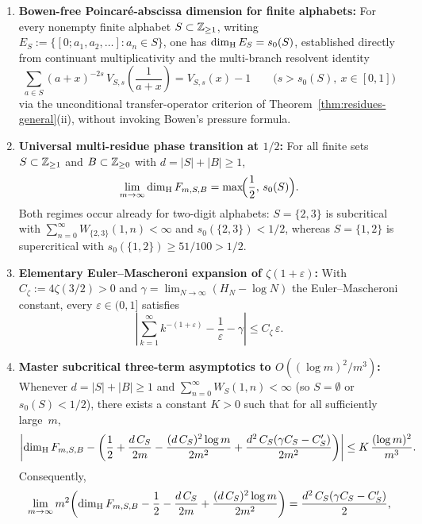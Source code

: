 \begin{theorem}\label{thm:multi-residue-asymptotic}
\begin{enumerate}[label=\textup{(\roman*)},leftmargin=2.2em]
\item \textbf{Bowen-free Poincar\'e-abscissa dimension for finite alphabets:}
For every nonempty finite alphabet $S\subset\mathbb{Z}_{\ge1}$, writing
$E_S:=\{[0;a_1,a_2,\dots]:a_n\in S\}$, one has $\dim_{\mathrm{H}} E_S=s_0(S)$, established
directly from continuant multiplicativity and the multi-branch resolvent
identity
\begin{equation}\label{eq:multi-resolvent-branch}
\sum_{a\in S}(a+x)^{-2s}\,V_{S,s}\!\left(\frac{1}{a+x}\right)=V_{S,s}(x)-1
\qquad\bigl(s>s_0(S),\ x\in[0,1]\bigr)
\end{equation}
via the unconditional transfer-operator criterion of Theorem~\ref{thm:residues-general}\textup{(ii)},
without invoking Bowen's pressure formula.
\item \textbf{Universal multi-residue phase transition at $1/2$:}
For all finite sets $S\subset\mathbb{Z}_{\ge1}$ and $B\subset\mathbb{Z}_{\ge0}$ with
$d=|S|+|B|\ge1$,
\[
\lim_{m\to\infty}\dim_{\mathrm{H}} F_{m,S,B}=\max\!\Bigl(\frac12,\,s_0(S)\Bigr).
\]
Both regimes occur already for two-digit alphabets: $S=\{2,3\}$ is subcritical
with $\sum_{n=0}^\infty W_{\{2,3\}}(1,n)<\infty$ and $s_0(\{2,3\})<1/2$, whereas
$S=\{1,2\}$ is supercritical with $s_0(\{1,2\})\ge 51/100>1/2$.
\item \textbf{Elementary Euler--Mascheroni expansion of $\zeta(1+\varepsilon)$:}
With $C_\zeta:=4\zeta(3/2)>0$ and $\gamma=\lim_{N\to\infty}(H_N-\log N)$ the
Euler--Mascheroni constant, every $\varepsilon\in(0,1]$ satisfies
\[
\left|\sum_{k=1}^\infty k^{-(1+\varepsilon)}-\frac{1}{\varepsilon}-\gamma\right|
\le C_\zeta\,\varepsilon.
\]
\item \textbf{Master subcritical three-term asymptotics to $O((\log m)^2/m^3)$:}
Whenever $d=|S|+|B|\ge1$ and $\sum_{n=0}^\infty W_S(1,n)<\infty$
(so $S=\emptyset$ or $s_0(S)<1/2$), there exists a constant $K>0$ such that for
all sufficiently large~$m$,
\begin{equation}\label{eq:multi-dimH-three-term}
\left|\dim_{\mathrm{H}} F_{m,S,B}-\left(\frac12+\frac{d\,C_S}{2m}-\frac{(d\,C_S)^2\log m}{2m^2}+\frac{d^2\,C_S(\gamma C_S-C_S')}{2m^2}\right)\right|
\le K\,\frac{(\log m)^2}{m^3}.
\end{equation}
Consequently,
\[
\lim_{m\to\infty}m^2\!\left(\dim_{\mathrm{H}} F_{m,S,B}-\frac12-\frac{d\,C_S}{2m}+\frac{(d\,C_S)^2\log m}{2m^2}\right)
=\frac{d^2\,C_S(\gamma C_S-C_S')}{2},
\]
\end{enumerate}
\end{theorem}
